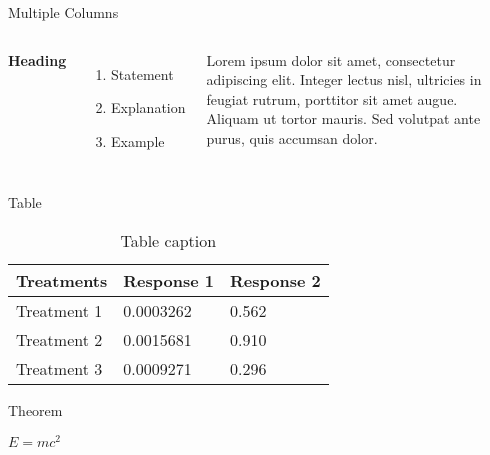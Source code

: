\documentclass[aspectratio=169,xcolor=dvipsnames]{beamer}
\begin{document}
\begin{frame}{Multiple Columns}
    \begin{columns}[c] %

        \textbf{Heading}
        \begin{enumerate}
            \item Statement
            \item Explanation
            \item Example
        \end{enumerate}

        Lorem ipsum dolor sit amet, consectetur adipiscing elit. Integer lectus nisl, ultricies in feugiat rutrum, porttitor sit amet augue. Aliquam ut tortor mauris. Sed volutpat ante purus, quis accumsan dolor.

    \end{columns}
\end{frame}


\begin{frame}{Table}
    \begin{table}
        \begin{tabular}{l l l}
            \toprule
            \textbf{Treatments} & \textbf{Response 1} & \textbf{Response 2} \\
            \midrule
            Treatment 1         & 0.0003262           & 0.562               \\
            Treatment 2         & 0.0015681           & 0.910               \\
            Treatment 3         & 0.0009271           & 0.296               \\
            \bottomrule
        \end{tabular}
        \caption{Table caption}
    \end{table}
\end{frame}


\begin{frame}{Theorem}
    \begin{theorem}
        $E = mc^2$
    \end{theorem}
\end{frame}
\end{document}
